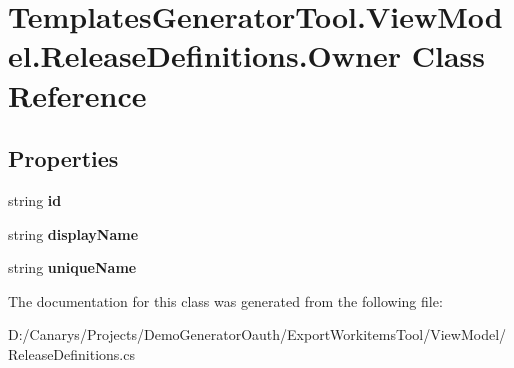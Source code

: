 \hypertarget{class_templates_generator_tool_1_1_view_model_1_1_release_definitions_1_1_owner}{}\section{Templates\+Generator\+Tool.\+View\+Model.\+Release\+Definitions.\+Owner Class Reference}
\label{class_templates_generator_tool_1_1_view_model_1_1_release_definitions_1_1_owner}
\subsection*{Properties}
\begin{DoxyCompactItemize}
\item 
\mbox{\label{class_templates_generator_tool_1_1_view_model_1_1_release_definitions_1_1_owner_a633dd59a4d0aa138b1c0d1cc1697e495}} 
string {\bfseries id}
\item 
\mbox{\label{class_templates_generator_tool_1_1_view_model_1_1_release_definitions_1_1_owner_a90a0a1d9031d28da3293ab9ca03bdd8e}} 
string {\bfseries display\+Name}
\item 
\mbox{\label{class_templates_generator_tool_1_1_view_model_1_1_release_definitions_1_1_owner_a047cb2c8cd6dc196104d00359a9784c2}} 
string {\bfseries unique\+Name}
\end{DoxyCompactItemize}


The documentation for this class was generated from the following file\+:\begin{DoxyCompactItemize}
\item 
D\+:/\+Canarys/\+Projects/\+Demo\+Generator\+Oauth/\+Export\+Workitems\+Tool/\+View\+Model/Release\+Definitions.\+cs\end{DoxyCompactItemize}

